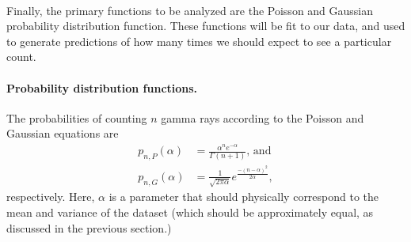 \paragraph{}
Finally, the primary functions to be analyzed are the Poisson and Gaussian probability distribution function. These functions will be fit to our data, and used to generate predictions of how many times we should expect to see a particular count.
\paragraph{Probability distribution functions.}
The probabilities of counting $n$ gamma rays according to the Poisson and Gaussian equations are
\begin{align} 
    p_{n, P} \left(\alpha\right) &= \frac{\alpha^n e^{-\alpha}}{\Gamma \left(n + 1\right)} \text{, and} \label{eqn:poisson-pdf} \\
    p_{n, G} \left(\alpha\right) &= \frac{1}{\sqrt{2 \pi \alpha}} e^{\frac{-\left(n - \alpha\right)^2}{2 \alpha}}, \label{eqn:gaussian-pdf}
\end{align}
respectively. Here, $\alpha$ is a parameter that should physically correspond to the mean and variance of the dataset (which should be approximately equal, as discussed in the previous section.)
